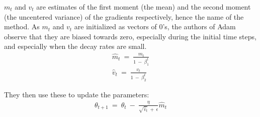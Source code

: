 $m_t$ and $v_t$ are estimates of the first moment (the mean) and the second moment (the uncentered variance) of the gradients respectively, hence the name of the method. As $m_t$ and $v_t$ are initialized as vectors of 0's, the authors of Adam observe that they are biased towards zero, especially during the initial time steps, and especially when the decay rates are small.
\begin{align}
    \hat{m}_t \: = \: \frac{m_t}{1\:-\:\beta^t_1} \\
 \hat{v}_t \: = \: \frac{v_t}{1\: - \: \beta^t_2}
\end{align}



They then use these to update the parameters:
\begin{align}
\theta_{t+1} \: = \: \theta_t \: - \: \frac{\eta}{\sqrt{\hat{v}_t} \: +\: \epsilon} \hat{m}_t 
\end{align}
	

	
